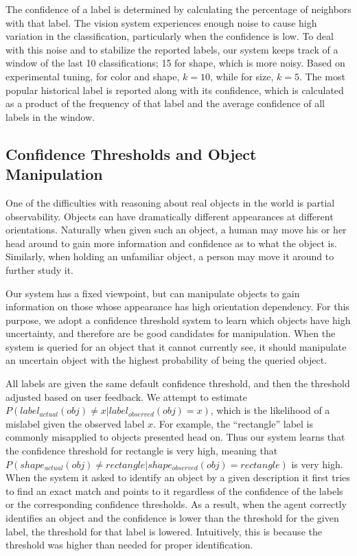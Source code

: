 \documentclass[11pt]{article}
\begin{document}
The confidence of a label is determined by calculating the percentage of
neighbors with that label. The vision system experiences enough noise
to cause high variation in the classification, particularly when the
confidence is low.  To deal with this noise and to stabilize the reported labels,
our system keeps track of a window of the last 10 classifications; 15 for shape, which is
more noisy. Based on experimental tuning, for color and shape, $k=10$, while
for size, $k=5$. The most popular historical label is reported along with its
confidence, which is calculated as a product of the frequency of that label
and the average confidence of all labels in the window.

\subsection{Confidence Thresholds and Object Manipulation}
One of the difficulties with reasoning about real objects in the world is
partial observability. Objects can have dramatically different appearances
at different orientations. Naturally when given such an object, a human may move
his or her head around to gain more information and confidence as to what the object
is.  Similarly, when holding an unfamiliar object, a person may move it around
to further study it.

Our system has a fixed viewpoint, but can
manipulate objects to gain information on those whose appearance has high
orientation dependency. For this purpose, we adopt a confidence threshold system
to learn which objects have high uncertainty, and therefore are
be good candidates for manipulation. When the system is queried for an object
that it cannot currently see, it should manipulate an uncertain object with the
highest probability of being the queried object.

All labels are given the same default confidence threshold, and then the
threshold adjusted based on user feedback.
We attempt to estimate $P(label_{actual}(obj) \neq x |
                                       label_{observed}(obj) = x)$,
which is the likelihood of a mislabel given the observed label $x$. For
example, the ``rectangle'' label is commonly misapplied to objects presented
head on. Thus our system learns that the confidence threshold for rectangle is
very high, meaning that $P(shape_{actual}(obj) \neq
                         rectangle|shape_{observed}(obj) = rectangle)$
is very high. When the system it asked to identify an object by a given
description it first tries to find an exact match and points to
it regardless of the confidence of the labels or the
corresponding confidence thresholds. As a result, when the agent
correctly identifies an object and the confidence is lower than the
threshold for the given label, the threshold for that label is lowered.
Intuitively, this is because the threshold was higher than needed for proper
identification.
\end{document}
